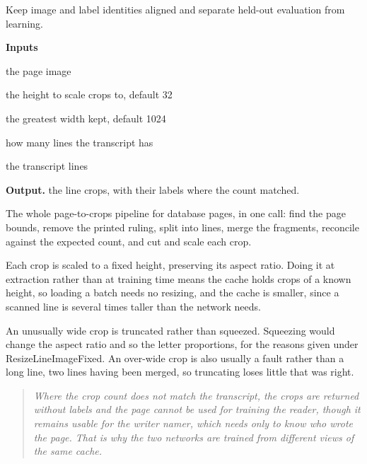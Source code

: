 Keep image and label identities aligned and separate held-out evaluation from learning.




\noindent\textbf{Inputs}
\begin{description}[leftmargin=2.2em,style=nextline,font=\normalfont\ttfamily]\setlength\itemsep{1pt}
  \item[{page}] \normalfont the page image
  \item[{targetHeight}] \normalfont the height to scale crops to, default 32
  \item[{maxWidth}] \normalfont the greatest width kept, default 1024
  \item[{expectedLineCount}] \normalfont how many lines the transcript has
  \item[{labelLines}] \normalfont the transcript lines
\end{description}

\noindent\textbf{Output.} the line crops, with their labels where the count matched.


The whole page-to-crops pipeline for database pages, in one call: find the page bounds, remove the printed ruling, split into lines, merge the fragments, reconcile against the expected count, and cut and scale each crop.


Each crop is scaled to a fixed height, preserving its aspect ratio. Doing it at extraction rather than at training time means the cache holds crops of a known height, so loading a batch needs no resizing, and the cache is smaller, since a scanned line is several times taller than the network needs.


An unusually wide crop is truncated rather than squeezed. Squeezing would change the aspect ratio and so the letter proportions, for the reasons given under ResizeLineImageFixed. An over-wide crop is also usually a fault rather than a long line, two lines having been merged, so truncating loses little that was right.


\begin{quote}\small\itshape Where the crop count does not match the transcript, the crops are returned without labels and the page cannot be used for training the reader, though it remains usable for the writer namer, which needs only to know who wrote the page. That is why the two networks are trained from different views of the same cache.\end{quote}


